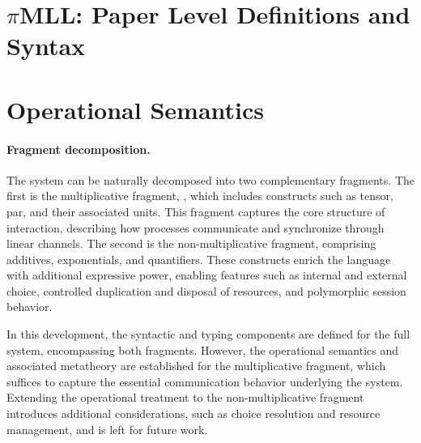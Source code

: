 




\section{$\pi$MLL: Paper Level Definitions and Syntax}




\section{Operational Semantics}

\paragraph{Fragment decomposition.}
The system \pill can be naturally decomposed into two complementary fragments. The first is the multiplicative fragment, \pimll, which includes constructs such as tensor, par, and their associated units. This fragment captures the core structure of interaction, describing how processes communicate and synchronize through linear channels. The second is the non-multiplicative fragment, comprising additives, exponentials, and quantifiers. These constructs enrich the language with additional expressive power, enabling features such as internal and external choice, controlled duplication and disposal of resources, and polymorphic session behavior.

In this development, the syntactic and typing components are defined for the full \pill system, encompassing both fragments. However, the operational semantics and associated metatheory are established for the multiplicative fragment, which suffices to capture the essential communication behavior underlying the system. Extending the operational treatment to the non-multiplicative fragment introduces additional considerations, such as choice resolution and resource management, and is left for future work.
